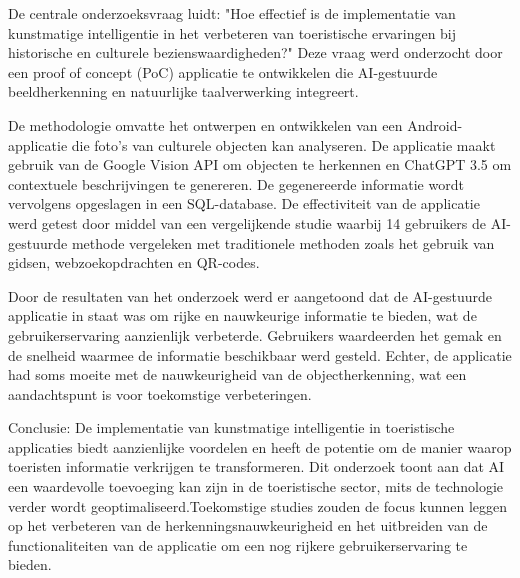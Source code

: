 De centrale onderzoeksvraag luidt: "Hoe effectief is de implementatie van kunstmatige intelligentie in het verbeteren van toeristische ervaringen bij historische en culturele bezienswaardigheden?" Deze vraag werd onderzocht door een proof of concept (PoC) applicatie te ontwikkelen die AI-gestuurde beeldherkenning en natuurlijke taalverwerking integreert.

De methodologie omvatte het ontwerpen en ontwikkelen van een Android-applicatie die foto's van culturele objecten kan analyseren. De applicatie maakt gebruik van de Google Vision API om objecten te herkennen en ChatGPT 3.5 om contextuele beschrijvingen te genereren. De gegenereerde informatie wordt vervolgens opgeslagen in een SQL-database. De effectiviteit van de applicatie werd getest door middel van een vergelijkende studie waarbij 14 gebruikers de AI-gestuurde methode vergeleken met traditionele methoden zoals het gebruik van gidsen, webzoekopdrachten en QR-codes.

Door de resultaten van het onderzoek werd er aangetoond dat de AI-gestuurde applicatie in staat was om rijke en nauwkeurige informatie te bieden, wat de gebruikerservaring aanzienlijk verbeterde. Gebruikers waardeerden het gemak en de snelheid waarmee de informatie beschikbaar werd gesteld. Echter, de applicatie had soms moeite met de nauwkeurigheid van de objectherkenning, wat een aandachtspunt is voor toekomstige verbeteringen.

Conclusie: De implementatie van kunstmatige intelligentie in toeristische applicaties biedt aanzienlijke voordelen en heeft de potentie om de manier waarop toeristen informatie verkrijgen te transformeren. Dit onderzoek toont aan dat AI een waardevolle toevoeging kan zijn in de toeristische sector, mits de technologie verder wordt geoptimaliseerd.Toekomstige studies zouden de focus kunnen leggen op het verbeteren van de herkenningsnauwkeurigheid en het uitbreiden van de functionaliteiten van de applicatie om een nog rijkere gebruikerservaring te bieden.
